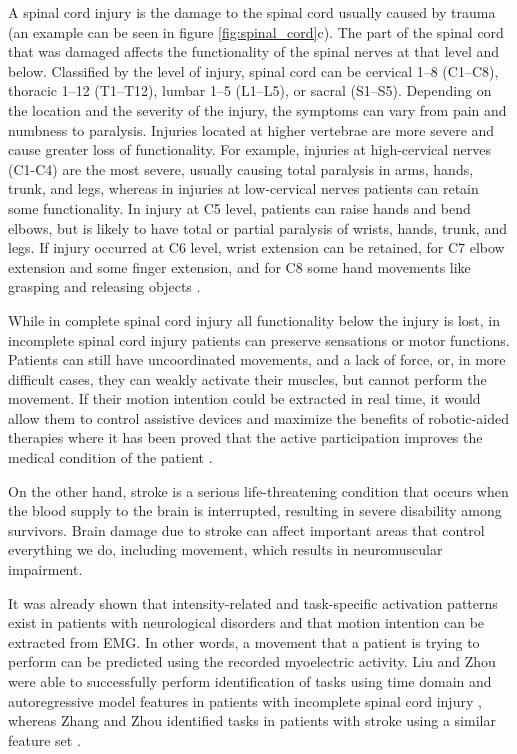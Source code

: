 A spinal cord injury is the damage to the spinal cord usually caused by trauma (an example can be seen in figure \ref{fig:spinal_cord}c). The part of the spinal cord that was damaged affects the functionality of the spinal nerves at that level and below. Classified by the level of injury, spinal cord can be cervical 1–8 (C1–C8), thoracic 1–12 (T1–T12), lumbar 1–5 (L1–L5), or sacral (S1–S5). Depending on the location and the severity of the injury, the symptoms can vary from pain and numbness to paralysis. Injuries located at higher vertebrae are more severe and cause greater loss of functionality. For example, injuries at high-cervical nerves (C1-C4) are the most severe, usually causing total paralysis in arms, hands, trunk, and legs, whereas in injuries at low-cervical nerves patients can retain some functionality. In injury at C5 level, patients can raise hands and bend elbows, but is likely to have total or partial paralysis of wrists, hands, trunk, and legs. If injury occurred at C6 level, wrist extension can be retained, for C7 elbow extension and some finger extension, and for C8 some hand movements like grasping and releasing objects \citep{ShepherdCenter2011}.

While in complete spinal cord injury all functionality below the injury is lost, in incomplete spinal cord injury patients can preserve sensations or motor functions. Patients can still have uncoordinated movements, and a lack of force, or, in more difficult cases, they can weakly activate their muscles, but cannot perform the movement. If their motion intention could be extracted in real time, it would allow them to control assistive devices and maximize the benefits of robotic-aided therapies where it has been proved that the active participation improves the medical condition of the patient \citep{Hogan2006}.

On the other hand, stroke is a serious life-threatening condition that occurs when the blood supply to the brain is interrupted, resulting in severe disability among survivors. Brain damage due to stroke can affect important areas that control everything we do, including movement, which results in neuromuscular impairment.

It was already shown that intensity-related and task-specific activation patterns exist in patients with neurological disorders and that motion intention can be extracted from EMG. In other words, a movement that a patient is trying to perform can be predicted using the recorded myoelectric activity. Liu and Zhou were able to successfully perform identification of tasks using time domain and autoregressive model features in patients with incomplete spinal cord injury \citep{Liu2013}, whereas Zhang and Zhou identified tasks in patients with stroke using a similar feature set \citep{Zhang2012}.

